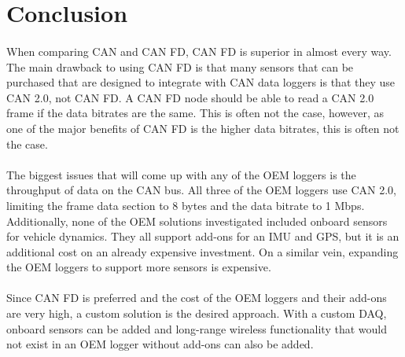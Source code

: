 \section{Conclusion}

\paragraph{}
When comparing CAN and CAN FD, CAN FD is superior in almost every way.
The main drawback to using CAN FD is that many sensors that can be purchased that are designed to integrate with CAN data loggers is that they use CAN 2.0, not CAN FD.
A CAN FD node should be able to read a CAN 2.0 frame if the data bitrates are the same.
This is often not the case, however, as one of the major benefits of CAN FD is the higher data bitrates, this is often not the case.

\paragraph{}
The biggest issues that will come up with any of the OEM loggers is the throughput of data on the CAN bus.
All three of the OEM loggers use CAN 2.0, limiting the frame data section to 8 bytes and the data bitrate to 1 Mbps.
Additionally, none of the OEM solutions investigated included onboard sensors for vehicle dynamics.
They all support add-ons for an IMU and GPS, but it is an additional cost on an already expensive investment.
On a similar vein, expanding the OEM loggers to support more sensors is expensive.

\paragraph{}
Since CAN FD is preferred and the cost of the OEM loggers and their add-ons are very high, a custom solution is the desired approach.
With a custom DAQ, onboard sensors can be added and long-range wireless functionality that would not exist in an OEM logger without add-ons can also be added.
